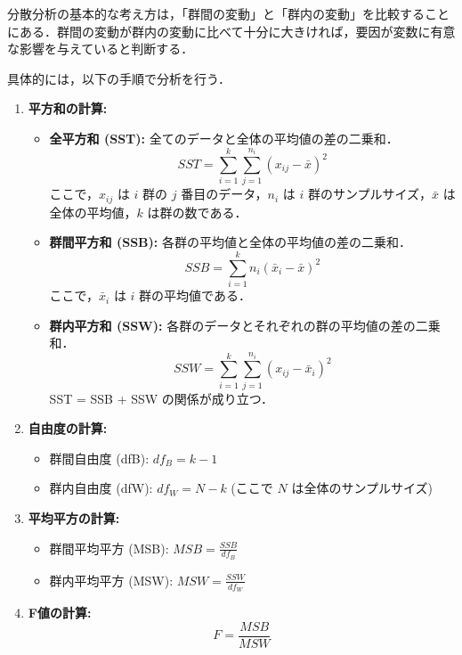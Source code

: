 \documentclass[11pt]{jreport}
\begin{document}
分散分析の基本的な考え方は，「群間の変動」と「群内の変動」を比較することにある．群間の変動が群内の変動に比べて十分に大きければ，要因が変数に有意な影響を与えていると判断する．

具体的には，以下の手順で分析を行う．

\begin{enumerate}
    \item \textbf{平方和の計算:}
    \begin{itemize}
        \item \textbf{全平方和 (SST):} 全てのデータと全体の平均値の差の二乗和．
        \begin{equation}
        SST = \sum_{i=1}^{k} \sum_{j=1}^{n_i} (x_{ij} - \bar{x})^2
        \end{equation}
        ここで，$x_{ij}$ は $i$ 群の $j$ 番目のデータ，$n_i$ は $i$ 群のサンプルサイズ，$\bar{x}$ は全体の平均値，$k$ は群の数である．
        \item \textbf{群間平方和 (SSB):} 各群の平均値と全体の平均値の差の二乗和．
        \begin{equation}
        SSB = \sum_{i=1}^{k} n_i (\bar{x}_i - \bar{x})^2
        \end{equation}
        ここで，$\bar{x}_i$ は $i$ 群の平均値である．
        \item \textbf{群内平方和 (SSW):} 各群のデータとそれぞれの群の平均値の差の二乗和．
        \begin{equation}
        SSW = \sum_{i=1}^{k} \sum_{j=1}^{n_i} (x_{ij} - \bar{x}_i)^2
        \end{equation}
        SST = SSB + SSW の関係が成り立つ．
    \end{itemize}
    \item \textbf{自由度の計算:}
    \begin{itemize}
        \item 群間自由度 (dfB): $df_B = k - 1$
        \item 群内自由度 (dfW): $df_W = N - k$ (ここで $N$ は全体のサンプルサイズ)
    \end{itemize}
    \item \textbf{平均平方の計算:}
    \begin{itemize}
        \item 群間平均平方 (MSB): $MSB = \frac{SSB}{df_B}$
        \item 群内平均平方 (MSW): $MSW = \frac{SSW}{df_W}$
    \end{itemize}
    \item \textbf{F値の計算:}
    \begin{equation}
    F = \frac{MSB}{MSW}
    \end{equation}
\end{enumerate}
\end{document}
